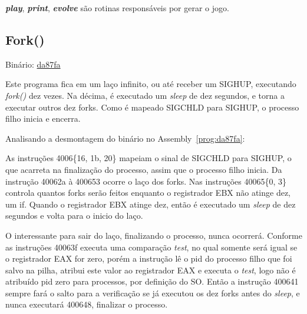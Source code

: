 \par\textbf{\emph{play}}, \textbf{\emph{print}},
\textbf{\emph{evolve}} são rotinas responsáveis por gerar o jogo.


\subsection{Fork()}
Binário: \href{https://s3.amazonaws.com/chaordic-desafio-cloud/da87fa}{da87fa}

Este programa fica em um laço infinito, ou até receber um SIGHUP,
executando \emph{fork()} dez vezes. Na décima, é executado um
\emph{sleep} de dez segundos, e torna a executar outros dez
forks. Como é mapeado SIGCHLD para SIGHUP, o processo filho inicia e
encerra.

Analisando a desmontagem do binário no Assembly~\ref{prog:da87fa}:



As instruções 4006\{16, 1b, 20\} mapeiam o sinal de SIGCHLD para
SIGHUP, o que acarreta na finalização do processo, assim que o processo
filho inicia. Da instrução 40062a à 400653 ocorre o laço dos
forks. Nas instruções 40065\{0, 3\} controla quantos forks serão
feitos enquanto o registrador EBX não atinge dez, um if. Quando o
registrador EBX atinge dez, então é executado um \emph{sleep} de dez
segundos e volta para o inicio do laço.

O interessante para sair do laço, finalizando o processo, nunca
ocorrerá. Conforme as instruções 40063f executa uma comparação
\emph{test}, no qual somente será igual se o registrador EAX for zero,
porém a instrução lê o pid do processo filho que foi salvo na pilha,
atribui este valor ao registrador EAX e executa o \emph{test}, logo
não é atribuído pid zero para processos, por definição do SO. Então a
instrução 400641 sempre fará o salto para a verificação se já executou
os dez forks antes do \emph{sleep}, e nunca executará 400648,
finalizar o processo. 